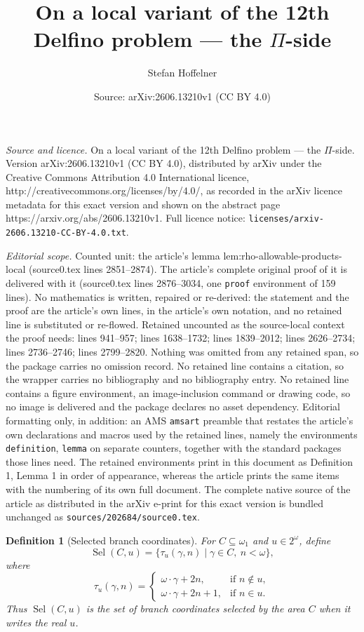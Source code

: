 \documentclass[10pt,a4paper]{amsart}
\title{On a local variant of the 12th Delfino problem --- the $\Pi$-side}
\author{Stefan Hoffelner}
\date{Source: arXiv:2606.13210v1 (CC BY 4.0)}
\newtheorem{definition}{Definition}
\begin{document}
\maketitle

\noindent\emph{Source and licence.} On a local variant of the 12th Delfino problem --- the $\Pi$-side. Version arXiv:2606.13210v1 (CC BY 4.0), distributed by arXiv under the Creative Commons Attribution 4.0 International licence, http://creativecommons.org/licenses/by/4.0/, as recorded in the arXiv licence metadata for this exact version and shown on the abstract page https://arxiv.org/abs/2606.13210v1. Full licence notice: \texttt{licenses/arxiv-2606.13210-CC-BY-4.0.txt}.\par\smallskip

\noindent\textit{Editorial scope.} Counted unit: the article's lemma lem:rho-allowable-products-local (source0.tex lines 2851--2874). The article's complete original proof of it is delivered with it (source0.tex lines 2876--3034, one \texttt{proof} environment of 159 lines). No mathematics is written, repaired or re-derived: the statement and the proof are the article's own lines, in the article's own notation, and no retained line is substituted or re-flowed.  Retained uncounted as the source-local context the proof needs: lines 941--957; lines 1638--1732; lines 1839--2012; lines 2626--2734; lines 2736--2746; lines 2799--2820.  Nothing was omitted from any retained span, so the package carries no omission record.  No retained line contains a citation, so the wrapper carries no bibliography and no bibliography entry.  No retained line contains a figure environment, an image-inclusion command or drawing code, so no image is delivered and the package declares no asset dependency.  Editorial formatting only, in addition: an AMS \texttt{amsart} preamble that restates the article's own declarations and macros used by the retained lines, namely the environments \texttt{definition}, \texttt{lemma} on separate counters, together with the standard packages those lines need.  The retained environments print in this document as Definition 1, Lemma 1 in order of appearance, whereas the article prints the same items with the numbering of its own full document.  The complete native source of the article as distributed in the arXiv e-print for this exact version is bundled unchanged as \texttt{sources/202684/source0.tex}.
\begin{definition}[Selected branch coordinates]\label{def:selected-branch-coordinates}
For \(C\subseteq\omega_1\) and \(u\in2^\omega\), define
\[
   \operatorname{Sel}(C,u)=
   \{\tau_u(\gamma,n)\mid \gamma\in C,\ n<\omega\},
\]
where
\[
   \tau_u(\gamma,n)=
   \begin{cases}
      \omega\cdot\gamma+2n, &\text{if } n\notin u,\\
      \omega\cdot\gamma+2n+1, &\text{if } n\in u.
   \end{cases}
\]
Thus \(\operatorname{Sel}(C,u)\) is the set of branch coordinates selected by
the area \(C\) when it writes the real \(u\).
\end{definition}
\end{document}
